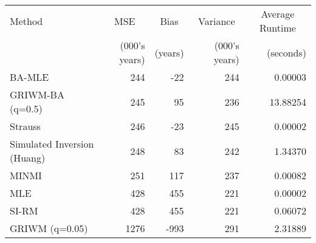 
\begin{tabular}{lrrrr}
\toprule
\multicolumn{1}{l}{Method} & \multicolumn{1}{c}{MSE} & \multicolumn{1}{c}{Bias} & \multicolumn{1}{c}{Variance} & \multicolumn{1}{c}{Average Runtime} \\
 & (000's years) & (years) & (000's years) & (seconds)\\
\midrule
BA-MLE & 244 & -22 & 244 & 0.00003\\
GRIWM-BA (q=0.5) & 245 & 95 & 236 & 13.88254\\
Strauss & 246 & -23 & 245 & 0.00002\\
Simulated Inversion (Huang) & 248 & 83 & 242 & 1.34370\\
MINMI & 251 & 117 & 237 & 0.00082\\
\addlinespace
MLE & 428 & 455 & 221 & 0.00002\\
SI-RM & 428 & 455 & 221 & 0.06072\\
GRIWM (q=0.05) & 1276 & -993 & 291 & 2.31889\\
\bottomrule
\end{tabular}
